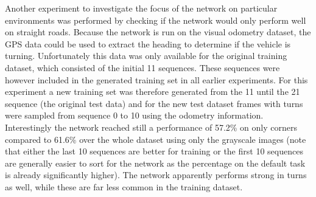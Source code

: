 Another experiment to investigate the focus of the network on particular environments was performed by checking if the network would only perform well on straight roads. Because the network is run on the visual odometry dataset, the GPS data could be used to extract the heading to determine if the vehicle is turning. Unfortunately this data was only available for the original training dataset, which consisted of the initial 11 sequences. These sequences were however included in the generated training set in all earlier experiments. For this experiment a new training set was therefore generated from the 11 until the 21 sequence (the original test data) and for the new test dataset frames with turns were sampled from sequence 0 to 10 using the odometry information. Interestingly the network reached still a performance of 57.2\% on only corners compared to 61.6\% over the whole dataset using only the grayscale images (note that either the last 10 sequences are better for training or the first 10 sequences are generally easier to sort for the network as the percentage on the default task is already significantly higher). The network apparently performs strong in turns as well, while these are far less common in the training dataset. 



